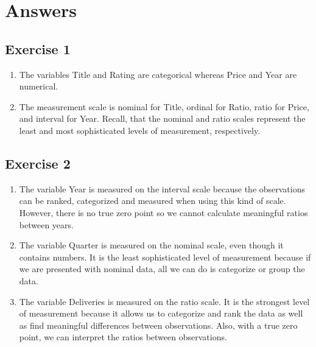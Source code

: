 \documentclass[
  letterpaper,
  DIV=11,
  numbers=noendperiod]{scrreprt}
\begin{document}
\hypertarget{answers}{%
\section{Answers}\label{answers}}

\hypertarget{exercise-1-1}{%
\subsection*{Exercise 1}\label{exercise-1-1}}

\begin{enumerate}
\def\labelenumi{\arabic{enumi}.}
\item
  The variables Title and Rating are categorical whereas Price and Year
  are numerical.
\item
  The measurement scale is nominal for Title, ordinal for Ratio, ratio
  for Price, and interval for Year. Recall, that the nominal and ratio
  scales represent the least and most sophisticated levels of
  measurement, respectively.
\end{enumerate}

\hypertarget{exercise-2-1}{%
\subsection*{Exercise 2}\label{exercise-2-1}}

\begin{enumerate}
\def\labelenumi{\arabic{enumi}.}
\item
  The variable Year is measured on the interval scale because the
  observations can be ranked, categorized and measured when using this
  kind of scale. However, there is no true zero point so we cannot
  calculate meaningful ratios between years.
\item
  The variable Quarter is measured on the nominal scale, even though it
  contains numbers. It is the least sophisticated level of measurement
  because if we are presented with nominal data, all we can do is
  categorize or group the data.
\item
  The variable Deliveries is measured on the ratio scale. It is the
  strongest level of measurement because it allows us to categorize and
  rank the data as well as find meaningful differences between
  observations. Also, with a true zero point, we can interpret the
  ratios between observations.
\end{enumerate}
\end{document}
